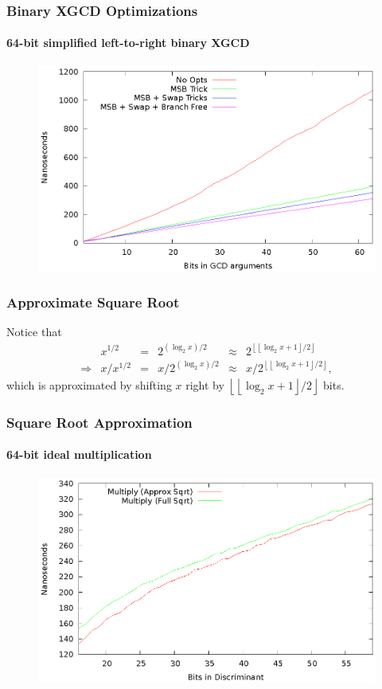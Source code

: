 \documentclass{beamer}
\newcommand{\floor}[1]{\left\lfloor #1 \right\rfloor}
\begin{document}
\begin{frame}
\frametitle{Binary XGCD Optimizations}
\framesubtitle{64-bit simplified left-to-right binary XGCD}
\begin{figure}
\includegraphics[scale=0.86]{xgcd-binary-optimizations-64}
\end{figure}
\end{frame}


\begin{frame}
\frametitle{Approximate Square Root}
Notice that
\begin{equation*}
\begin{array}{rrlrlr}
	& x^{1/2} &=& 2^{(\log_2x)/2} &\approx& 2^{\floor{\floor{\log_2x+1}/2}} \\
	\Rightarrow & x / x^{1/2} &=& x / 2^{(\log_2x)/2} &\approx& x / 2^{\floor{\floor{\log_2x+1}/2}},
\end{array}
\end{equation*}
which is approximated by shifting $x$ right by $\floor{\floor{\log_2x+1}/2}$ bits.
\end{frame}

\begin{frame}
\frametitle{Square Root Approximation}
\framesubtitle{64-bit ideal multiplication}
\begin{figure}
\includegraphics[scale=0.86]{compose-sqrtopt-64}
\end{figure}
\end{frame}
\end{document}
